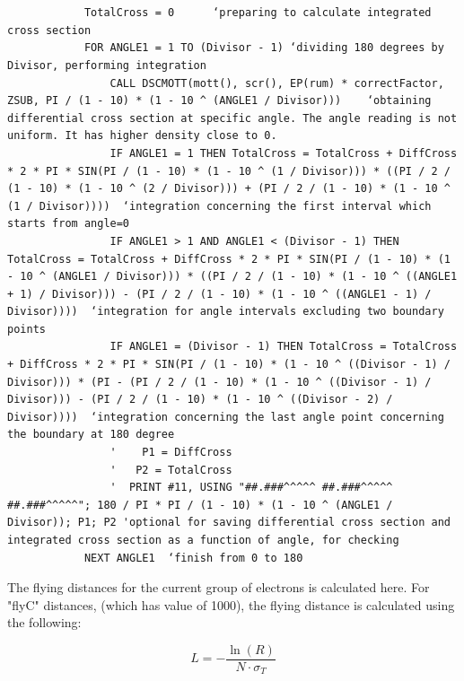 \documentclass[10pt, reqno]{exam}
\begin{document}
\begin{verbatim}

            
            TotalCross = 0      ‘preparing to calculate integrated cross section 
            FOR ANGLE1 = 1 TO (Divisor - 1) ‘dividing 180 degrees by Divisor, performing integration
                CALL DSCMOTT(mott(), scr(), EP(rum) * correctFactor, ZSUB, PI / (1 - 10) * (1 - 10 ^ (ANGLE1 / Divisor)))    ‘obtaining differential cross section at specific angle. The angle reading is not uniform. It has higher density close to 0.
                IF ANGLE1 = 1 THEN TotalCross = TotalCross + DiffCross * 2 * PI * SIN(PI / (1 - 10) * (1 - 10 ^ (1 / Divisor))) * ((PI / 2 / (1 - 10) * (1 - 10 ^ (2 / Divisor))) + (PI / 2 / (1 - 10) * (1 - 10 ^ (1 / Divisor))))  ‘integration concerning the first interval which starts from angle=0
                IF ANGLE1 > 1 AND ANGLE1 < (Divisor - 1) THEN TotalCross = TotalCross + DiffCross * 2 * PI * SIN(PI / (1 - 10) * (1 - 10 ^ (ANGLE1 / Divisor))) * ((PI / 2 / (1 - 10) * (1 - 10 ^ ((ANGLE1 + 1) / Divisor))) - (PI / 2 / (1 - 10) * (1 - 10 ^ ((ANGLE1 - 1) / Divisor))))  ‘integration for angle intervals excluding two boundary points
                IF ANGLE1 = (Divisor - 1) THEN TotalCross = TotalCross + DiffCross * 2 * PI * SIN(PI / (1 - 10) * (1 - 10 ^ ((Divisor - 1) / Divisor))) * (PI - (PI / 2 / (1 - 10) * (1 - 10 ^ ((Divisor - 1) / Divisor))) - (PI / 2 / (1 - 10) * (1 - 10 ^ ((Divisor - 2) / Divisor))))  ‘integration concerning the last angle point concerning the boundary at 180 degree
                '    P1 = DiffCross
                '   P2 = TotalCross
                '  PRINT #11, USING "##.###^^^^^ ##.###^^^^^ ##.###^^^^^"; 180 / PI * PI / (1 - 10) * (1 - 10 ^ (ANGLE1 / Divisor)); P1; P2 'optional for saving differential cross section and integrated cross section as a function of angle, for checking 
            NEXT ANGLE1  ‘finish from 0 to 180
\end{verbatim}

The flying distances for the current group of electrons is calculated here. For "flyC" distances, (which has value of 1000), the flying distance is calculated using the following:

\begin{equation}
    L = -\frac{\ln(R)}{N\cdot \sigma_T}
    \label{eq:flying distance}
\end{equation}
\end{document}
